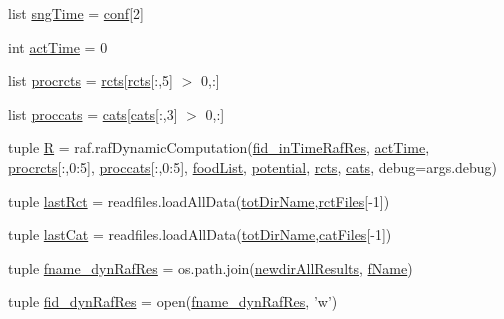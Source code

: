 \begin{DoxyCompactItemize}
\item 
list \hyperlink{a00117_ab4296f1ae2e4c4bb597ca27e84849510}{sng\-Time} = \hyperlink{a00117_adc567db25548116293968a9102beab98}{conf}\mbox{[}2\mbox{]}
\item 
int \hyperlink{a00117_a9c2013c88f8354ccf6504c51843f1d5e}{act\-Time} = 0
\item 
list \hyperlink{a00117_a2120e8355b3501aed0114a74091d56c1}{procrcts} = \hyperlink{a00117_ac2fe1ed3228b8e616f25ccfbe4cc7dc4}{rcts}\mbox{[}\hyperlink{a00117_ac2fe1ed3228b8e616f25ccfbe4cc7dc4}{rcts}\mbox{[}\-:,5\mbox{]} $>$ 0,\-:\mbox{]}
\item 
list \hyperlink{a00117_a4e3c4b627d098aef6c7905cb20683e07}{proccats} = \hyperlink{a00117_adc0282a6415a88834556e66807bcc800}{cats}\mbox{[}\hyperlink{a00117_adc0282a6415a88834556e66807bcc800}{cats}\mbox{[}\-:,3\mbox{]} $>$ 0,\-:\mbox{]}
\item 
tuple \hyperlink{a00117_aa51f04a64cdea4fbde3c2d484d06d443}{R} = raf.\-raf\-Dynamic\-Computation(\hyperlink{a00117_ab82095abcedb97b7abf8e003f4724d0c}{fid\-\_\-in\-Time\-Raf\-Res}, \hyperlink{a00117_a9c2013c88f8354ccf6504c51843f1d5e}{act\-Time}, \hyperlink{a00117_a2120e8355b3501aed0114a74091d56c1}{procrcts}\mbox{[}\-:,0\-:5\mbox{]}, \hyperlink{a00117_a4e3c4b627d098aef6c7905cb20683e07}{proccats}\mbox{[}\-:,0\-:5\mbox{]}, \hyperlink{a00117_a07ce1f0750b6dc5baff89792fc194152}{food\-List}, \hyperlink{a00117_abe4c267a63409b1b7cd9c6aaf0779b4a}{potential}, \hyperlink{a00117_ac2fe1ed3228b8e616f25ccfbe4cc7dc4}{rcts}, \hyperlink{a00117_adc0282a6415a88834556e66807bcc800}{cats}, debug=args.\-debug)
\item 
tuple \hyperlink{a00117_a519d451fb14acb6fb50a108ac2b8b261}{last\-Rct} = readfiles.\-load\-All\-Data(\hyperlink{a00117_a82f73a786e4c93e909fd689ee0d0812e}{tot\-Dir\-Name},\hyperlink{a00117_a9016a8f5eafe76e4e8dbb1bc3ce94af5}{rct\-Files}\mbox{[}-\/1\mbox{]})
\item 
tuple \hyperlink{a00117_ad65fb0887c659a9bf884cba677b67272}{last\-Cat} = readfiles.\-load\-All\-Data(\hyperlink{a00117_a82f73a786e4c93e909fd689ee0d0812e}{tot\-Dir\-Name},\hyperlink{a00117_a189dc9cf606d870dacab059d5e7dca24}{cat\-Files}\mbox{[}-\/1\mbox{]})
\item 
tuple \hyperlink{a00117_a6a031fb0c5a0a5519fc4c3f6d7ef35d1}{fname\-\_\-dyn\-Raf\-Res} = os.\-path.\-join(\hyperlink{a00117_af73b43f5468097ae9443adeb6010a75c}{newdir\-All\-Results}, \hyperlink{a00117_a9fff4b23f9489649601960dabc4a6cdd}{f\-Name})
\item 
tuple \hyperlink{a00117_aaff6b4fb4c2e2089c2a207a12f1757e3}{fid\-\_\-dyn\-Raf\-Res} = open(\hyperlink{a00117_a6a031fb0c5a0a5519fc4c3f6d7ef35d1}{fname\-\_\-dyn\-Raf\-Res}, 'w')

\end{DoxyCompactItemize}
